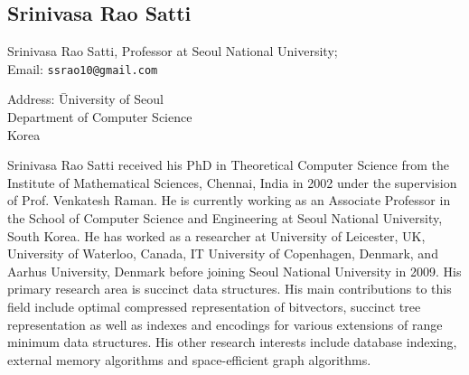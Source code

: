 \documentclass[a4paper,10pt]{article}
\begin{document}
\subsection*{Srinivasa Rao Satti}

\begin{multicols}{2}
\noindent Srinivasa Rao Satti, Professor at Seoul National  University; \\
Email: \texttt{ssrao10@gmail.com} \\
\begin{tabbing}
Address: \=  University of Seoul\\
\> Department of Computer Science\\
\> Korea
\end{tabbing}
\end{multicols}

Srinivasa Rao Satti received his PhD in Theoretical Computer Science from the Institute of Mathematical Sciences, Chennai, India in 2002 under the supervision of Prof. Venkatesh Raman. He is currently working as an Associate Professor in the School of Computer Science and Engineering at Seoul National University, South Korea. He has worked as a researcher at University of Leicester, UK, University of Waterloo, Canada, IT University of Copenhagen, Denmark, and Aarhus University, Denmark before joining Seoul National University in 2009. His primary research area is succinct data structures. His main contributions to this field include optimal compressed representation of bitvectors, succinct tree representation as well as indexes and encodings for various extensions of range minimum data structures.  His other research interests include database indexing, external memory algorithms and space-efficient graph algorithms.
\end{document}
